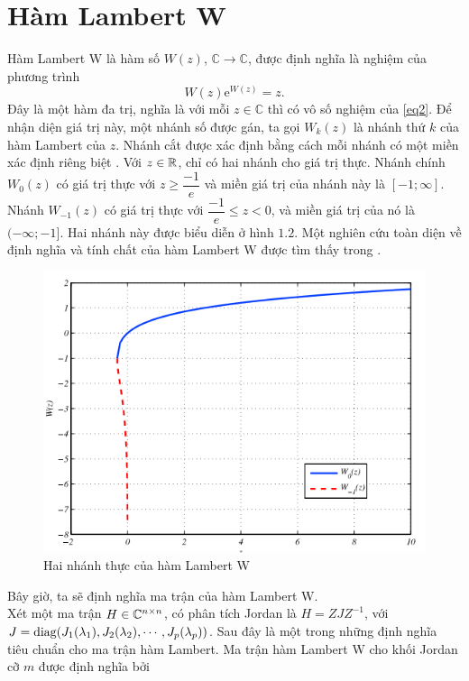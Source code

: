 \section{Hàm Lambert W}
Hàm Lambert W là hàm số $W(z)$, $\mathbb{C} \to \mathbb{C}$, được định nghĩa là nghiệm của phương trình
\begin{equation}\label{eq2}
	W(z) \mathrm{e}^{W(z) }=z.
\end{equation}
Đây là một hàm đa trị, nghĩa là với mỗi $z \in \mathbb{C}$ thì có vô số nghiệm của \eqref{eq2}. Để nhận diện giá trị này, một nhánh số được gán, ta gọi $W_k(z)$ là nhánh thứ $k$ của hàm Lambert của $z$. Nhánh cắt được xác định bằng cách mỗi nhánh có một miền xác định riêng biệt \cite{Cor96}. Với $z \in \mathbb{R}$, chỉ có hai nhánh cho giá trị thực. Nhánh chính $W_0(z)$ có giá trị thực với $z \ge \dfrac{-1}{e}$ và miền giá trị của nhánh này là $[-1;\infty]$. Nhánh $W_{-1}(z)$ có giá trị thực với $\dfrac{-1}{e} \le z < 0$, và miền giá trị của nó là $(-\infty; -1]$. Hai nhánh này được biểu diễn ở hình $1.2$.
Một nghiên cứu toàn diện về định nghĩa và tính chất của hàm Lambert W được tìm thấy trong \cite{Cor96}.
\begin{figure}[h!]
	\centering
	\includegraphics[scale= 0.7]{"./Hinh/Hinh 1"}
	\caption[Hai nhánh thực của hàm Lambert W]{Hai nhánh thực của hàm Lambert W}
	\label{fig:hinh-1}
\end{figure}
Bây giờ, ta sẽ định nghĩa ma trận của hàm Lambert W. \\
Xét một ma trận $H \in \mathbb{C} ^{n\times n}$, có phân tích Jordan là $H = ZJZ^{-1}$, với $J = \mathrm{diag} (J_1(\lambda_1),J_2(\lambda_2), \cdots , J_p(\lambda_p) )$. Sau đây là một trong những định nghĩa tiêu chuẩn cho ma trận hàm Lambert. Ma trận hàm Lambert W cho khối Jordan cỡ $m$ được định nghĩa bởi
